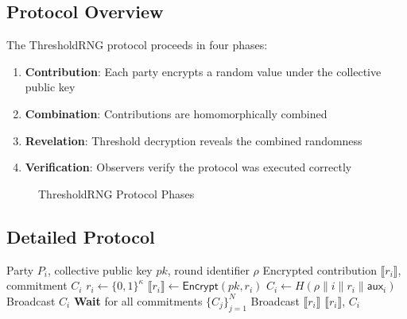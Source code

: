 \documentclass[11pt,a4paper]{article}
\begin{document}
\subsection{Protocol Overview}

The ThresholdRNG protocol proceeds in four phases:

\begin{enumerate}
    \item \textbf{Contribution}: Each party encrypts a random value under the collective public key
    \item \textbf{Combination}: Contributions are homomorphically combined
    \item \textbf{Revelation}: Threshold decryption reveals the combined randomness
    \item \textbf{Verification}: Observers verify the protocol was executed correctly
\end{enumerate}

\begin{figure}[h]
\centering
{}
\caption{ThresholdRNG Protocol Phases}
\end{figure}

\subsection{Detailed Protocol}

\begin{algorithm}
\caption{ThresholdRNG: Contribution Phase}
\begin{algorithmic}[1]
\Require Party $P_i$, collective public key $pk$, round identifier $\rho$
\Ensure Encrypted contribution $\llbracket r_i \rrbracket$, commitment $C_i$
\State $r_i \leftarrow \{0, 1\}^{\kappa}$ 
\State $\llbracket r_i \rrbracket \gets \textsf{Encrypt}(pk, r_i)$
\State $C_i \gets H(\rho \| i \| r_i \| \textsf{aux}_i)$ 
\State Broadcast $C_i$
\State \textbf{Wait} for all commitments $\{C_j\}_{j=1}^N$
\State Broadcast $\llbracket r_i \rrbracket$
\State \Return $\llbracket r_i \rrbracket$, $C_i$
\end{algorithmic}
\end{algorithm}
\end{document}
